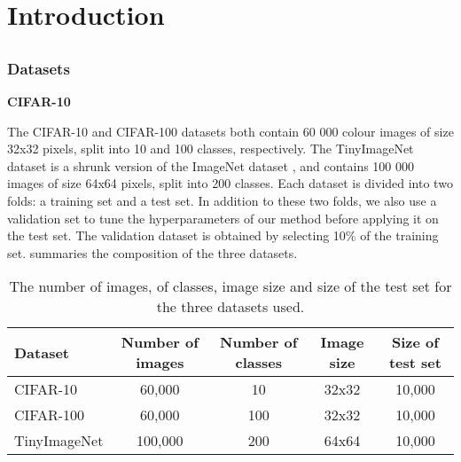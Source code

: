 \chapter{Introduction}
\section{}
\subsection{Datasets}

\textbf{CIFAR-10}


The CIFAR-10 and CIFAR-100 datasets both contain 60 000 colour images of size
32x32 pixels, split into 10 and 100 classes, respectively. The TinyImageNet
dataset is a shrunk version of the ImageNet dataset
\cite{DBLP:journals/ijcv/RussakovskyDSKS15}, and contains 100 000 images of size
64x64 pixels, split into 200 classes. Each dataset is divided into two folds: a
training set and a test set. In addition to these two folds, we also use a
validation set to tune the hyperparameters of our method before applying it on
the test set. The validation dataset is obtained by selecting 10\% of the
training set.  summaries the composition of the three
datasets.\\


\begin{table}[ht]
  \centering
  \begin{tabular}{lcccc}
    \toprule
    \textbf{Dataset}    & \textbf{Number of images} & \textbf{Number of classes} &
    \textbf{Image size} & \textbf{Size of test set}                                               \\
    \hline
    CIFAR-10             & 60,000                    & 10                         & 32x32 & 10,000 \\
    CIFAR-100            & 60,000                    & 100                        & 32x32 & 10,000 \\
    TinyImageNet        & 100,000                   & 200                        & 64x64 & 10,000 \\
    \bottomrule
  \end{tabular}
  \caption{The number of images, of classes, image size and size of the test set for the three datasets used.}
  \label{tab:chap1:datasets}
\end{table}

